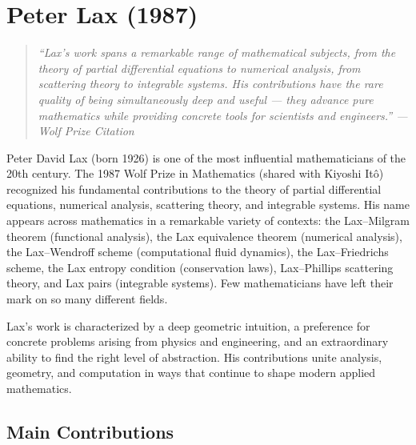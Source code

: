 \let\R\relax
\newcommand{\R}{\mathbb{R}}
\let\C\relax
\newcommand{\C}{\mathbb{C}}
\let\N\relax
\newcommand{\N}{\mathbb{N}}
\let\Z\relax
\newcommand{\Z}{\mathbb{Z}}

\chapter{Peter Lax (1987)}

\begin{quote}
\it ``Lax's work spans a remarkable range of mathematical subjects, from the theory of partial differential equations to numerical analysis, from scattering theory to integrable systems. His contributions have the rare quality of being simultaneously deep and useful --- they advance pure mathematics while providing concrete tools for scientists and engineers.'' --- Wolf Prize Citation
\end{quote}

Peter David Lax (born 1926) is one of the most influential mathematicians of the 20th century. The 1987 Wolf Prize in Mathematics (shared with Kiyoshi It\^{o}) recognized his fundamental contributions to the theory of partial differential equations, numerical analysis, scattering theory, and integrable systems. His name appears across mathematics in a remarkable variety of contexts: the Lax--Milgram theorem (functional analysis), the Lax equivalence theorem (numerical analysis), the Lax--Wendroff scheme (computational fluid dynamics), the Lax--Friedrichs scheme, the Lax entropy condition (conservation laws), Lax--Phillips scattering theory, and Lax pairs (integrable systems). Few mathematicians have left their mark on so many different fields.

Lax's work is characterized by a deep geometric intuition, a preference for concrete problems arising from physics and engineering, and an extraordinary ability to find the right level of abstraction. His contributions unite analysis, geometry, and computation in ways that continue to shape modern applied mathematics.

\section{Main Contributions}


